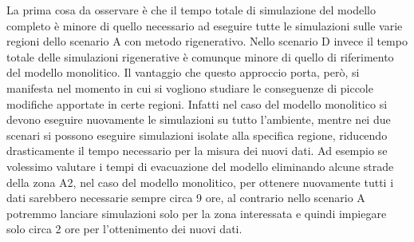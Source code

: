 La prima cosa da osservare è che il tempo totale di simulazione del modello completo è minore di quello necessario ad eseguire tutte le simulazioni sulle varie regioni dello scenario A con metodo rigenerativo. Nello scenario D invece il tempo totale delle simulazioni rigenerative è comunque minore di quello di riferimento del modello monolitico. Il vantaggio che questo approccio porta, però, si manifesta nel momento in cui si vogliono studiare le conseguenze di piccole modifiche apportate in certe regioni. Infatti nel caso del modello monolitico si devono eseguire nuovamente le simulazioni su tutto l'ambiente, mentre nei due scenari si possono eseguire simulazioni isolate alla specifica regione, riducendo drasticamente il tempo necessario per la misura dei nuovi dati. Ad esempio se volessimo valutare i tempi di evacuazione del modello eliminando alcune strade della zona A2, nel caso del modello monolitico, per ottenere nuovamente tutti i dati sarebbero necessarie sempre circa 9 ore, al contrario nello scenario A potremmo lanciare simulazioni solo per la zona interessata e quindi impiegare solo circa 2 ore per l'ottenimento dei nuovi dati.
 
